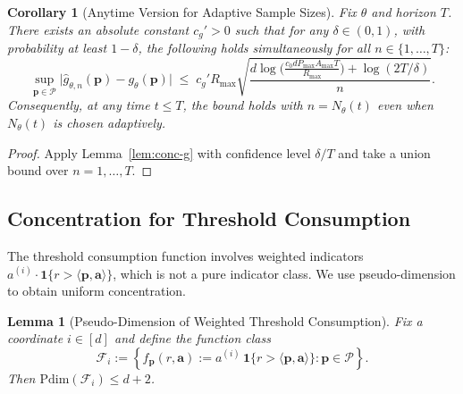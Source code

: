 \documentclass[11pt]{article}
\newtheorem{lemma}[theorem]{Lemma}
\newtheorem{corollary}[theorem]{Corollary}
\newcommand{\ba}{\mathbf{a}}
\newcommand{\bp}{\mathbf{p}}
\newcommand{\cP}{\mathcal{P}}
\begin{document}
\begin{corollary}[Anytime Version for Adaptive Sample Sizes]
\label{cor:conc-g-anytime}
Fix $\theta$ and horizon $T$. There exists an absolute constant $c_g'>0$ such that for any $\delta\in(0,1)$,
with probability at least $1-\delta$, the following holds simultaneously for all $n\in\{1,\dots,T\}$:
\[
\sup_{\bp\in\cP}\big|\widehat g_{\theta,n}(\bp)-g_\theta(\bp)\big|
\;\le\;
c_g' R_{\max}\sqrt{\frac{d\log\!\Big(\frac{c_0 d P_{\max} A_{\max} T}{R_{\max}}\Big)+\log(2T/\delta)}{n}}.
\]
Consequently, at any time $t\le T$, the bound holds with $n=N_\theta(t)$ even when $N_\theta(t)$ is
chosen adaptively.
\end{corollary}

\begin{proof}
Apply Lemma~\ref{lem:conc-g} with confidence level $\delta/T$ and take a union bound over $n=1,\dots,T$.
\end{proof}

\subsection{Concentration for Threshold Consumption}

The threshold consumption function involves weighted indicators $a^{(i)} \cdot \mathbf{1}\{r > \langle \bp, \ba \rangle\}$, which is not a pure indicator class. We use pseudo-dimension to obtain uniform concentration.

\begin{lemma}[Pseudo-Dimension of Weighted Threshold Consumption]
\label{lem:pdim}
Fix a coordinate $i \in [d]$ and define the function class
\[
\mathcal{F}_i := \left\{ f_{\bp}(r, \ba) := a^{(i)} \, \mathbf{1}\{r > \langle \bp, \ba \rangle\} : \bp \in \cP \right\}.
\]
Then $\mathrm{Pdim}(\mathcal{F}_i) \le d + 2$.
\end{lemma}
\end{document}
